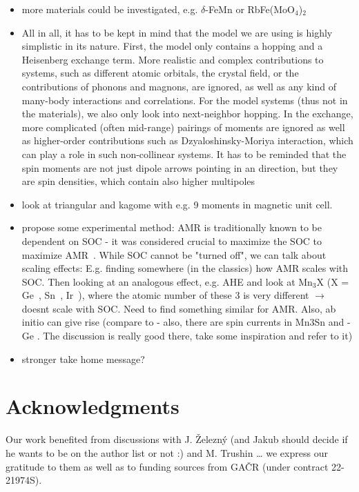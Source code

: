 \documentclass[prb,showpacs,amsmath,amssymb,superscriptaddress,twocolumn,floatfix]{revtex4-1}
\begin{document}
\begin{itemize}
	\item more materials could be investigated, e.g. $\delta$-FeMn
	or RbFe(MoO$_4$)$_2$
	\item All in all, it has to be kept in mind that the model we are using is highly simplistic in its nature. First, the model only contains a hopping and a Heisenberg exchange term. More realistic and complex contributions to systems, such as different atomic orbitals, the crystal field, or the contributions of phonons and magnons, are ignored, as well as any kind of many-body interactions and correlations. For the model systems (thus not in the materials), we also only look into next-neighbor hopping. In the exchange, more complicated (often mid-range) pairings of moments are ignored as well as higher-order contributions such as Dzyaloshinsky-Moriya interaction, which can play a role in such non-collinear systems. It has to be reminded that the spin moments are not just dipole arrows pointing in an direction, but they are spin densities, which contain also higher multipoles
	\item look at triangular and kagome with e.g. 9 moments in magnetic unit cell. 
	\item propose some experimental method: AMR is traditionally known to be dependent on SOC - it was considered crucial to maximize the SOC to maximize AMR~\cite{Ritzinger:2023}. While SOC cannot be "turned off", we can talk about scaling effects: E.g. finding somewhere (in the classics) how AMR scales with SOC. Then looking at an analogous effect, e.g. AHE and look at Mn$_3$X (X = Ge~\cite{Kiyohara:2016}, Sn~\cite{Nakatsuji:2015}, Ir~\cite{Iwaki:2020}), where the atomic number of these 3 is very different $\rightarrow$ doesnt scale with SOC. Need to find something similar for AMR. Also, ab initio can give rise (compare to \cite{Gonzalez-Hernandez:2024} - also, there are spin currents in Mn3Sn and -Ge \cite{Zelezny:2017}. The discussion is really good there, take some inspiration and refer to it)
	
	\item stronger take home message?
\end{itemize}


\section*{Acknowledgments}

Our work benefited from discussions with {\color{red}J. \v{Z}elezn\'y (and Jakub
should decide if he wants to be on the author list or not :)} and
M. Trushin \ldots
we express our gratitude to them as well as to funding sources from GA\v{C}R (under contract 22-21974S).
 
\end{document}
